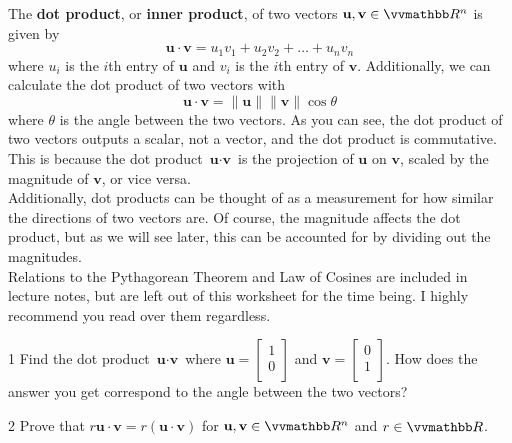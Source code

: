 \documentclass[11pt,fleqn]{article}
\begin{document}
\begin{center}
\begin{tcolorbox}[title={\fontsize{13pt}{13pt}\selectfont The Dot Product}, enforce breakable, pad at break=4mm, colframe=darkcrimson!100,colback=black!1,width=.9\linewidth,sharp corners=north]\fontsize{11.5pt}{12pt}\selectfont 
The \textbf{dot product}, or \textbf{inner product}, of two vectors $\textbf{u}, \textbf{v} \in \R^n$ is given by
$$
\textbf{u} \cdot \textbf{v} = u_1v_1 + u_2v_2 + \hdots + u_nv_n
$$
where $u_i$ is the $i$th entry of $\textbf{u}$ and $v_i$ is the $i$th entry of $\textbf{v}$. Additionally, we can calculate the dot product of two vectors with
$$
\textbf{u} \cdot \textbf{v} = \|\textbf{u}\| \|\textbf{v}\| \cos \theta
$$
where $\theta$ is the angle between the two vectors. As you can see, the dot product of two vectors outputs a scalar, not a vector, and the dot product is commutative. This is because the dot product $\textbf{u} \cdot \textbf{v}$ is the projection of $\textbf{u}$ on $\textbf{v}$, scaled by the magnitude of $\textbf{v}$, or vice versa.\\
Additionally, dot products can be thought of as a measurement for how similar the directions of two vectors are. Of course, the magnitude affects the dot product, but as we will see later, this can be accounted for by dividing out the magnitudes. \\
Relations to the Pythagorean Theorem and Law of Cosines are included in lecture notes, but are left out of this worksheet for the time being. I highly recommend you read over them regardless.
\end{tcolorbox}
\begin{exr}{}{1}
Find the dot product $\textbf{u} \cdot \textbf{v}$ where $\textbf{u} = \begin{bmatrix} 1 \\ 0 \\ \end{bmatrix}$ and $\textbf{v} = \begin{bmatrix} 0 \\ 1 \\ \end{bmatrix}$. How does the answer you get correspond to the angle between the two vectors?
\end{exr}

\begin{exr}{}{2}
Prove that $r\textbf{u} \cdot \textbf{v} = r(\textbf{u} \cdot \textbf{v})$ for $\textbf{u}, \textbf{v} \in \R^n$ and $r \in \R$.


\end{exr}
\end{center}
\end{document}
